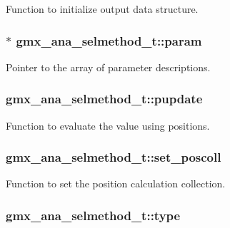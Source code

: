 \-Function to initialize output data structure. \hypertarget{structgmx__ana__selmethod__t_a1a26cbd06fbc4ab9a5744148d9af3503}{
\subsubsection[{param}]{ $\ast$ {\bf gmx\-\_\-ana\-\_\-selmethod\-\_\-t\-::param}}}\label{structgmx__ana__selmethod__t_a1a26cbd06fbc4ab9a5744148d9af3503}
\-Pointer to the array of parameter descriptions. \hypertarget{structgmx__ana__selmethod__t_a1c5c0b8aa5193ea0b329a649a9e166e7}{
\subsubsection[{pupdate}]{ {\bf gmx\-\_\-ana\-\_\-selmethod\-\_\-t\-::pupdate}}}\label{structgmx__ana__selmethod__t_a1c5c0b8aa5193ea0b329a649a9e166e7}
\-Function to evaluate the value using positions. \hypertarget{structgmx__ana__selmethod__t_a781523bb76062b89fe1ca7b4f218f4ed}{
\subsubsection[{set\-\_\-poscoll}]{ {\bf gmx\-\_\-ana\-\_\-selmethod\-\_\-t\-::set\-\_\-poscoll}}}\label{structgmx__ana__selmethod__t_a781523bb76062b89fe1ca7b4f218f4ed}
\-Function to set the position calculation collection. \hypertarget{structgmx__ana__selmethod__t_a20e7d732e116b48e2caa8ad8e0ea9dd5}{
\subsubsection[{type}]{ {\bf gmx\-\_\-ana\-\_\-selmethod\-\_\-t\-::type}}}\label{structgmx__ana__selmethod__t_a20e7d732e116b48e2caa8ad8e0ea9dd5}
